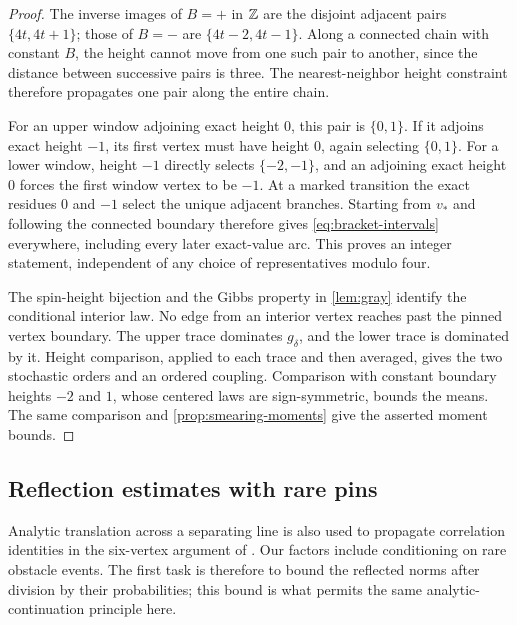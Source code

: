 \begin{proof}
The inverse images of $B=+$ in $\mathbb Z$ are the disjoint adjacent pairs
$\{4t,4t+1\}$; those of $B=-$ are $\{4t-2,4t-1\}$.  Along a
connected chain with constant $B$, the height cannot move from one
such pair to another, since the distance between successive pairs is
three.  The nearest-neighbor height constraint therefore propagates
one pair along the entire chain.

For an upper window adjoining exact height $0$, this pair is
$\{0,1\}$.  If it adjoins exact height $-1$, its first vertex must
have height $0$, again selecting $\{0,1\}$.  For a lower window,
height $-1$ directly selects $\{-2,-1\}$, and an adjoining exact
height $0$ forces the first window vertex to be $-1$.  At a marked
transition the exact residues $0$ and $-1$ select the unique adjacent
branches.  Starting from $v_*$ and following the connected boundary
therefore gives \eqref{eq:bracket-intervals} everywhere, including
every later exact-value arc.  This proves an integer statement,
independent of any choice of representatives modulo four.

The spin-height bijection and the Gibbs property in
\cref{lem:gray} identify the conditional interior law.  No edge from
an interior vertex reaches past the pinned vertex boundary.  The
upper trace dominates $g_\delta$, and the lower trace is dominated
by it.  Height comparison, applied to each trace and then averaged,
gives the two stochastic orders and an ordered coupling.  Comparison
with constant boundary heights $-2$ and $1$, whose centered laws are
sign-symmetric, bounds the means.  The same comparison and
\cref{prop:smearing-moments} give the asserted moment bounds.
\end{proof}

\subsection{Reflection estimates with rare pins}

Analytic translation across a separating line is also used to propagate
correlation identities in the six-vertex argument of
\cite[Section~7.1, especially Lemma~7.4]{DCKLM2026}.  Our factors include
conditioning on rare obstacle events.  The first task is therefore to
bound the reflected norms after division by their probabilities; this
bound is what permits the same analytic-continuation principle here.

